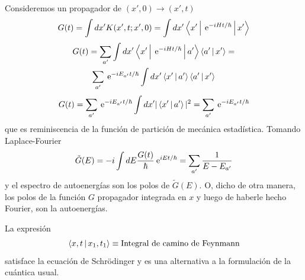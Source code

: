 \documentclass[10pt,oneside]{CBFT_book}
\begin{document}
Consideremos un propagador de $(x',0) \to (x',t)$
\[
	G(t) = \int dx' K(x',t ; x', 0) = \int dx' \Braket{x'|\:\mathrm{e}^{-i Ht/\hbar}|x'}
\]
\begin{multline*}
	G(t) = \sum_{a'} \int dx' \Braket{x'|\:\mathrm{e}^{-i Ht/\hbar}|a'}\Braket{a'|x'} = \\
		\sum_{a'} \:\mathrm{e}^{-i E_{a'}t/\hbar} \int dx' \Braket{x'|a'}\Braket{a'|x' } 
\end{multline*}
\[
	G(t) = \sum_{a'} \:\mathrm{e}^{-i E_{a'}t/\hbar} \int dx' |\Braket{x'|a'}|^2 = 
	\sum_{a'} \:\mathrm{e}^{-i E_{a'}t/\hbar} 
\]
que es reminiscencia de la función de partición de mecánica estadística. Tomando Laplace-Fourier 
\[
	\tilde{G}(E) = -i \int dE \frac{G(t)}{\hbar} \:\mathrm{e}^{i E t/\hbar} = \sum_{a'} \frac{1}{E-E_{a'}}
\]
y el espectro de autoenergías son los polos de $\tilde{G}(E)$.
O, dicho de otra manera, los polos de la función $G$ propagador integrada en $x$ y luego de
haberle hecho Fourier, son la autoenergías.


La expresión 
\[
	\Braket{x,t|x_1,t_1} \equiv \text{Integral de camino de Feynmann}
\]
satisface la ecuación de Schrödinger y es una alternativa a la formulación de la cuántica usual.
\end{document}
